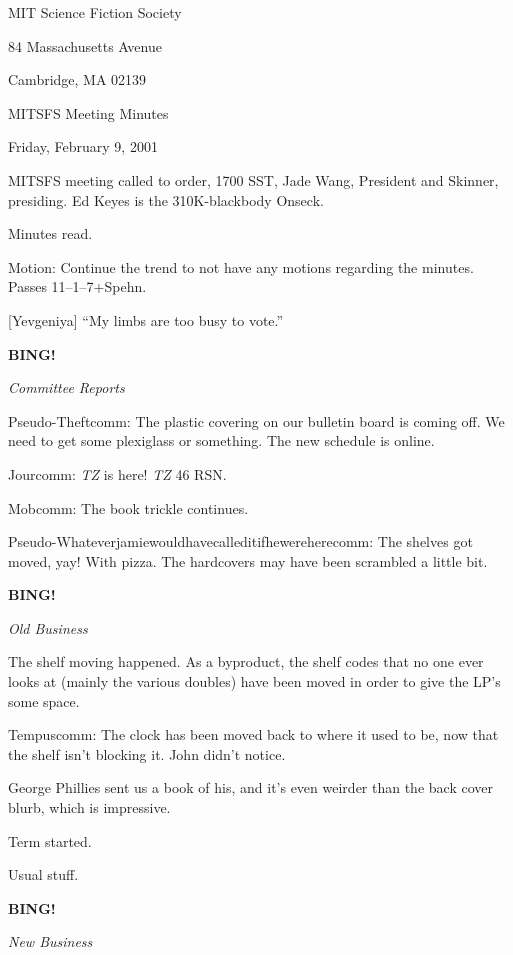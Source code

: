 \documentclass[12pt]{article}
\newcommand{\bing}{{\bf BING!} }
\newcommand{\goto}[1]{\bing \vskip 12pt \centerline{{\em{#1}}}}
\begin{document}
\begin{center}

MIT Science Fiction Society 

84 Massachusetts Avenue

Cambridge, MA 02139

\vspace{12pt}

MITSFS Meeting Minutes 

Friday, February 9, 2001

\end{center}
 
\vspace{18pt}

\setlength{\parskip}{6pt}

\noindent
MITSFS meeting called to order, 1700 SST, Jade Wang, President and
Skinner, presiding.  Ed Keyes is the 310K-blackbody Onseck.

Minutes read.

Motion: Continue the trend to not have any motions regarding the
minutes.  Passes 11--1--7+Spehn.

[Yevgeniya] ``My limbs are too busy to vote.''

\goto{Committee Reports}

Pseudo-Theftcomm: The plastic covering on our bulletin board is
coming off.  We need to get some plexiglass or something.  The new
schedule is online.

Jourcomm: {\em TZ} is here!  {\em TZ} 46 RSN.

Mobcomm: The book trickle continues.

Pseudo-Whateverjamiewouldhavecalleditifhewereherecomm: The shelves
got moved, yay!  With pizza.  The hardcovers may have been scrambled
a little bit.

\goto{Old Business}

The shelf moving happened.  As a byproduct, the shelf codes that no
one ever looks at (mainly the various doubles) have been moved in
order to give the LP's some space.

Tempuscomm: The clock has been moved back to where it used to be,
now that the shelf isn't blocking it.  John didn't notice.

George Phillies sent us a book of his, and it's even weirder than
the back cover blurb, which is impressive.

Term started.

Usual stuff.

\goto{New Business}
\end{document}
